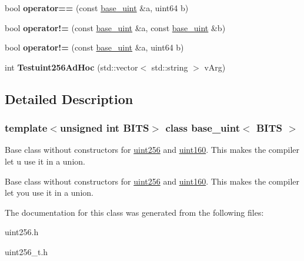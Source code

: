 \begin{DoxyCompactItemize}
\item 
\mbox{\label{classbase__uint_a3b10e641c44220f91ef495ddeed36199}} 
bool {\bfseries operator==} (const \mbox{\hyperlink{classbase__uint}{base\+\_\+uint}} \&a, uint64 b)
\item 
\mbox{\label{classbase__uint_a3cc3bccf252004fbbd2b96dc769378e7}} 
bool {\bfseries operator!=} (const \mbox{\hyperlink{classbase__uint}{base\+\_\+uint}} \&a, const \mbox{\hyperlink{classbase__uint}{base\+\_\+uint}} \&b)
\item 
\mbox{\label{classbase__uint_ace9d3752957848d4fafe820605cb0b19}} 
bool {\bfseries operator!=} (const \mbox{\hyperlink{classbase__uint}{base\+\_\+uint}} \&a, uint64 b)
\item 
\mbox{\label{classbase__uint_a4693ae47fe4f0b658eccfb36e6d51343}} 
int {\bfseries Testuint256\+Ad\+Hoc} (std\+::vector$<$ std\+::string $>$ v\+Arg)
\end{DoxyCompactItemize}


\subsection{Detailed Description}
\subsubsection*{template$<$unsigned int B\+I\+TS$>$\newline
class base\+\_\+uint$<$ B\+I\+T\+S $>$}

Base class without constructors for \mbox{\hyperlink{classuint256}{uint256}} and \mbox{\hyperlink{classuint160}{uint160}}. This makes the compiler let u use it in a union.

Base class without constructors for \mbox{\hyperlink{classuint256}{uint256}} and \mbox{\hyperlink{classuint160}{uint160}}. This makes the compiler let you use it in a union. 

The documentation for this class was generated from the following files\+:\begin{DoxyCompactItemize}
\item 
uint256.\+h\item 
uint256\+\_\+t.\+h\end{DoxyCompactItemize}
